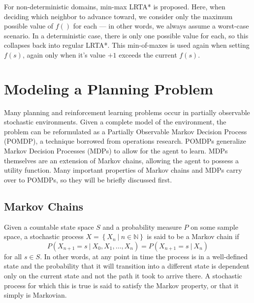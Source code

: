 \documentclass[tog]{acmsiggraph}
\newcommand{\given}[1][]{\:#1\vert\:}
\begin{document}
For non-deterministic domains, min-max LRTA*\cite{koenig2006real} is
proposed. Here, when deciding which neighbor to advance toward, we
consider only the maximum possible value of \(f()\) for each --- in
other words, we always assume a worst-case scenario. In a
deterministic case, there is only one possible value for each, so this
collapses back into regular LRTA*. This min-of-maxes is used again
when setting \(f(s)\), again only when it's value \(+1\) exceeds the
current \(f(s)\).

\section{Modeling a Planning Problem}

Many planning and reinforcement learning problems occur in partially 
observable stochastic environments. Given a complete model of the 
environment, the problem can be reformulated as a Partially Observable 
Markov Decision Process (POMDP), a technique borrowed from operations 
research. POMDPs generalize Markov Decision Processes (MDPs) to allow 
for the agent to learn. MDPs themselves are an extension of Markov chains, 
allowing the agent to possess a utility function. Many important 
properties of Markov chains and MDPs carry over to POMDPs, so they will 
be briefly discussed first.

\subsection{Markov Chains}

Given a countable state space $S$ and a probability measure $P$ on some 
sample space, a stochastic process $X = \left\{ X_n \given n \in \mathbb{N} \right\}$ 
is said to be a Markov chain if
\begin{equation*}
  P \left( X_{n+1} = s \given X_0, X_1, \ldots, X_n \right) = P \left( X_{n+1} = s \given X_n \right)
\end{equation*}
for all $s \in S$. In other words, at any point in time the process is 
in a well-defined state and the probability that it will transition into 
a different state is dependent only on the current state and not the path 
it took to arrive there. A stochastic process for which this is true is said 
to satisfy the Markov property, or that it simply is Markovian.
\end{document}
